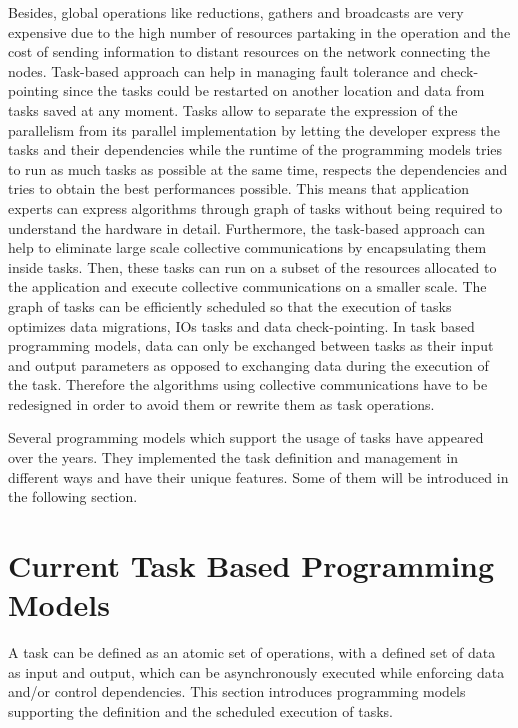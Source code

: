 Besides, global operations like reductions, gathers and broadcasts are very expensive due to the high number of resources partaking in the operation and the cost of sending information to distant resources on the network connecting the nodes.
Task-based approach can help in managing fault tolerance and check-pointing since the tasks could be restarted on another location and data from tasks saved at any moment.
Tasks allow to separate the expression of the parallelism from its parallel implementation by letting the developer express the tasks and their dependencies while the runtime of the programming models tries to run as much tasks as possible at the same time, respects the dependencies and tries to obtain the best performances possible.
This means that application experts can express algorithms through graph of tasks without being required to understand the hardware in detail.
Furthermore, the task-based approach can help to eliminate large scale collective communications by encapsulating them inside tasks.
Then, these tasks can run on a subset of the resources allocated to the application and execute collective communications on a smaller scale.
The graph of tasks can be efficiently scheduled so that the execution of tasks optimizes data migrations, IOs tasks and data check-pointing.
In task based programming models, data can only be exchanged between tasks as their input and output parameters as opposed to exchanging data during the execution of the task.
Therefore the algorithms using collective communications have to be redesigned in order to avoid them or rewrite them as task operations.

Several programming models which support the usage of tasks have appeared over the years.
They implemented the task definition and management in different ways and have their unique features.
Some of them will be introduced in the following section.


\section{Current Task Based Programming Models}
A task can be defined as an atomic set of operations, with a defined set of data as input and output, which can be asynchronously executed while enforcing data and/or control dependencies.
This section introduces programming models supporting the definition and the scheduled execution of tasks.

